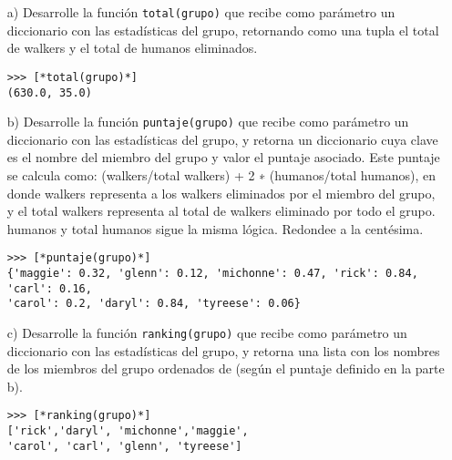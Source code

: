 \begin{itemize}
    \item[a)] Desarrolle la función \texttt{total(grupo)} que recibe como parámetro un diccionario con las estadísticas del grupo, retornando como una tupla el total de walkers y el total de humanos eliminados.
    \begin{lstlisting}[style=consola]
>>> [*total(grupo)*]
(630.0, 35.0)
    \end{lstlisting}
    \item[b)] Desarrolle la función \texttt{puntaje(grupo)} que recibe como parámetro un diccionario con las estadísticas del grupo, y retorna un diccionario cuya clave es el nombre del miembro del grupo y valor el puntaje asociado. Este puntaje se calcula como: (walkers/total walkers) + 2 ∗ (humanos/total humanos), en donde walkers representa a los walkers eliminados por el miembro del grupo, y el total walkers representa al total de walkers eliminado por todo el grupo. humanos y total humanos sigue la misma lógica. Redondee a la centésima.
    \begin{lstlisting}[style=consola]
>>> [*puntaje(grupo)*]
{'maggie': 0.32, 'glenn': 0.12, 'michonne': 0.47, 'rick': 0.84, 'carl': 0.16, 
'carol': 0.2, 'daryl': 0.84, 'tyreese': 0.06}
    \end{lstlisting}
    \item[c)]Desarrolle la función \texttt{ranking(grupo)} que recibe como parámetro un diccionario con las estadísticas del grupo, y retorna una lista con los nombres de los miembros del grupo ordenados de  (según el puntaje definido en la parte b).
    \begin{lstlisting}[style=consola]
>>> [*ranking(grupo)*]
['rick','daryl', 'michonne','maggie', 
'carol', 'carl', 'glenn', 'tyreese']
    \end{lstlisting}
\end{itemize}